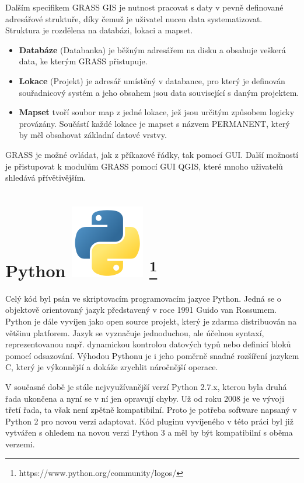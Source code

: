Dalším specifikem GRASS GIS je nutnost pracovat s daty v pevně
definované adresářové struktuře, díky čemuž je uživatel nucen data
systematizovat. Struktura je rozdělena na databázi, lokaci a mapset.
\begin{itemize}
	\item \textbf{Databáze} (Databanka) je běžným adresářem na disku a 
	obsahuje veškerá data, ke kterým GRASS přistupuje.
	\item \textbf{Lokace} (Projekt) je adresář umístěný v databance, 
	pro který je definován souřadnicový systém a jeho obsahem jsou data 
	související s daným projektem.
	\item \textbf{Mapset} tvoří soubor map z jedné lokace, jež jsou 
	určitým způsobem logicky provázány. Součástí každé lokace je mapset 
	s názvem PERMANENT, který by měl obsahovat základní datové vrstvy.
\end{itemize}
GRASS je možné ovládat, jak z příkazové řádky, tak pomocí GUI. Další
možností je přistupovat k modulům GRASS pomocí GUI QGIS, které mnoho
uživatelů shledává přívětivějším.

\newpage
\section[Python]{Python \includegraphics[scale=0.2]{./pictures/python.png}
\footnote{https://www.python.org/community/logos/}}
\label{python}
Celý kód byl psán ve skriptovacím programovacím jazyce Python. Jedná
se o objektově orientovaný jazyk představený v roce 1991 Guido van
Rossumem. Python je dále vyvíjen jako open source projekt, který je
zdarma distribuován na většinu platforem. Jazyk se vyznačuje
jednoduchou, ale účelnou syntaxí, reprezentovanou např. dynamickou
kontrolou datových typů nebo definicí bloků pomocí odsazování. Výhodou
Pythonu je i jeho poměrně snadné rozšíření jazykem C, který je
výkonnější a dokáže zrychlit náročnější operace.

V současné době je stále nejvyužívanější verzí Python 2.7.x, kterou
byla druhá řada ukončena a nyní se v ní jen opravují chyby. Už od roku
2008 je ve vývoji třetí řada, ta však není zpětně kompatibilní. Proto
je potřeba software napsaný v Python 2 pro novou verzi adaptovat. Kód 
pluginu vyvíjeného v této práci byl již vytvářen s ohledem na novou 
verzi Python 3 a měl by být kompatibilní s oběma verzemi.
\cite{diveIntoPython}\cite{learningPython}

